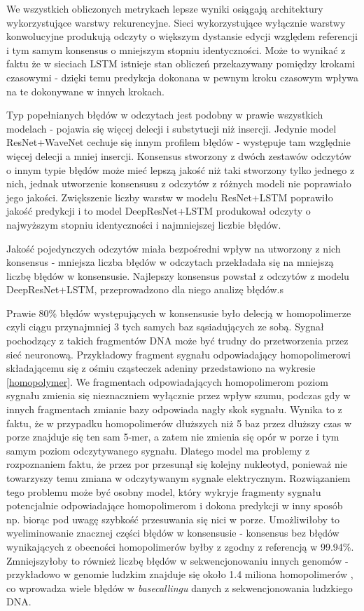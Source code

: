 \documentclass[a4paper,11pt,twoside]{report}
\theoremstyle{definition}
\begin{document}
We wszystkich obliczonych metrykach lepsze wyniki osiągają architektury wykorzystujące warstwy rekurencyjne. Sieci wykorzystujące wyłącznie warstwy konwolucyjne produkują odczyty o większym dystansie edycji względem referencji i tym samym konsensus o mniejszym stopniu identyczności. Może to wynikać z faktu że w sieciach LSTM istnieje stan obliczeń przekazywany pomiędzy krokami czasowymi - dzięki temu predykcja dokonana w pewnym kroku czasowym wpływa na te dokonywane w innych krokach. 

Typ popełnianych błędów w odczytach jest podobny w prawie wszystkich modelach - pojawia się więcej delecji i substytucji niż insercji. Jedynie model ResNet+WaveNet cechuje się innym profilem błędów - występuje tam względnie więcej delecji a mniej insercji. Konsensus stworzony z dwóch zestawów odczytów o innym typie błędów może mieć lepszą jakość niż taki stworzony tylko jednego z nich, jednak utworzenie konsensusu z odczytów z różnych modeli nie poprawiało jego jakości. Zwiększenie liczby warstw w modelu ResNet+LSTM poprawiło jakość predykcji i to model DeepResNet+LSTM produkował odczyty o najwyższym stopniu identyczności i najmniejszej liczbie błędów. 

Jakość pojedynczych odczytów miała bezpośredni wpływ na utworzony z nich konsensus - mniejsza liczba błędów w odczytach przekładała się na mniejszą liczbę błędów w konsensusie. Najlepszy konsensus powstał z odczytów z modelu DeepResNet+LSTM, przeprowadzono dla niego analizę błędów.s

Prawie 80\% błędów występujących w konsensusie było delecją w homopolimerze czyli ciągu przynajmniej 3 tych samych baz sąsiadujących ze sobą. Sygnał pochodzący z takich fragmentów DNA może być trudny do przetworzenia przez sieć neuronową. Przykładowy fragment sygnału odpowiadający homopolimerowi składającemu się z ośmiu cząsteczek adeniny przedstawiono na wykresie \ref{homopolymer}. We fragmentach odpowiadających homopolimerom poziom sygnału zmienia się nieznaczniem  wyłącznie przez wpływ szumu, podczas gdy w innych fragmentach zmianie bazy odpowiada nagły skok sygnału. Wynika to z  faktu, że w przypadku homopolimerów dłuższych niż 5 baz przez dłuższy czas w porze znajduje się ten sam 5-mer, a zatem nie zmienia się opór w porze i tym samym poziom odczytywanego sygnału. Dlatego model ma problemy z rozpoznaniem faktu, że przez por przesunął się kolejny nukleotyd, ponieważ nie towarzyszy temu zmiana w odczytywanym sygnale elektrycznym. Rozwiązaniem tego problemu może być osobny model, który wykryje fragmenty sygnału potencjalnie odpowiadające homopolimerom i dokona predykcji w inny sposób np. biorąc pod uwagę szybkość przesuwania się nici w porze. Umożliwiłoby to wyeliminowanie znacznej części błędów w konsensusie - konsensus bez błędów wynikających z obecności homopolimerów byłby z zgodny z referencją w 99.94\%. Zmniejszyłoby to również liczbę błędów w sekwencjonowaniu innych genomów - przykładowo w genomie ludzkim znajduje się około 1.4 miliona homopolimerów \cite{homopolymers}, co wprowadza wiele błędów w \textit{basecallingu} danych z sekwencjonowania ludzkiego DNA.
\end{document}
